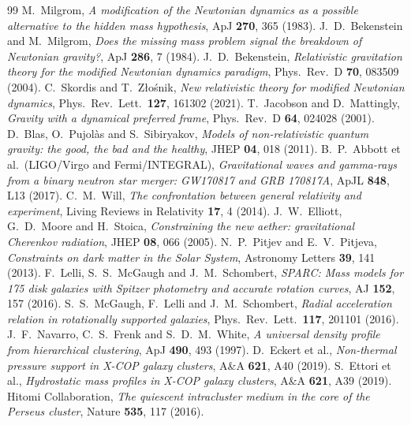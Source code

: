 \documentclass[11pt,letterpaper]{article}
\begin{document}
\begin{thebibliography}{99}
 M.\ Milgrom, \emph{A modification of the Newtonian dynamics as a possible alternative to the hidden mass hypothesis}, ApJ \textbf{270}, 365 (1983).
 J.\ D.\ Bekenstein and M.\ Milgrom, \emph{Does the missing mass problem signal the breakdown of Newtonian gravity?}, ApJ \textbf{286}, 7 (1984).
 J.\ D.\ Bekenstein, \emph{Relativistic gravitation theory for the modified Newtonian dynamics paradigm}, Phys.\ Rev.\ D \textbf{70}, 083509 (2004).
 C.\ Skordis and T.\ Z\l{}o\'snik, \emph{New relativistic theory for modified Newtonian dynamics}, Phys.\ Rev.\ Lett.\ \textbf{127}, 161302 (2021).
 T.\ Jacobson and D.\ Mattingly, \emph{Gravity with a dynamical preferred frame}, Phys.\ Rev.\ D \textbf{64}, 024028 (2001).
 D.\ Blas, O.\ Pujol\`as and S.\ Sibiryakov, \emph{Models of non-relativistic quantum gravity: the good, the bad and the healthy}, JHEP \textbf{04}, 018 (2011).
 B.\ P.\ Abbott et al.\ (LIGO/Virgo and Fermi/INTEGRAL), \emph{Gravitational waves and gamma-rays from a binary neutron star merger: GW170817 and GRB 170817A}, ApJL \textbf{848}, L13 (2017).
 C.\ M.\ Will, \emph{The confrontation between general relativity and experiment}, Living Reviews in Relativity \textbf{17}, 4 (2014).
 J.\ W.\ Elliott, G.\ D.\ Moore and H.\ Stoica, \emph{Constraining the new aether: gravitational Cherenkov radiation}, JHEP \textbf{08}, 066 (2005).
 N.\ P.\ Pitjev and E.\ V.\ Pitjeva, \emph{Constraints on dark matter in the Solar System}, Astronomy Letters \textbf{39}, 141 (2013).
 F.\ Lelli, S.\ S.\ McGaugh and J.\ M.\ Schombert, \emph{SPARC: Mass models for 175 disk galaxies with Spitzer photometry and accurate rotation curves}, AJ \textbf{152}, 157 (2016).
 S.\ S.\ McGaugh, F.\ Lelli and J.\ M.\ Schombert, \emph{Radial acceleration relation in rotationally supported galaxies}, Phys.\ Rev.\ Lett.\ \textbf{117}, 201101 (2016).
 J.\ F.\ Navarro, C.\ S.\ Frenk and S.\ D.\ M.\ White, \emph{A universal density profile from hierarchical clustering}, ApJ \textbf{490}, 493 (1997).
 D.\ Eckert et al., \emph{Non-thermal pressure support in X-COP galaxy clusters}, A\&A \textbf{621}, A40 (2019).
 S.\ Ettori et al., \emph{Hydrostatic mass profiles in X-COP galaxy clusters}, A\&A \textbf{621}, A39 (2019).
 Hitomi Collaboration, \emph{The quiescent intracluster medium in the core of the Perseus cluster}, Nature \textbf{535}, 117 (2016).

\end{thebibliography}
\end{document}
